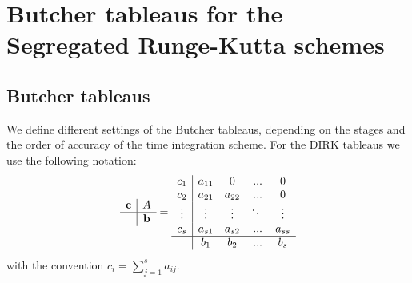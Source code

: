 \chapter{Butcher tableaus for the Segregated Runge-Kutta schemes} %
\label{appendix-butcher_tableaus}
\appendix
\section*{Butcher tableaus} %
\label{appendix:Butcher_tab}
We define different settings of the Butcher tableaus, depending on the stages and the order of accuracy of the time integration scheme. For the DIRK tableaus we use the following notation:
\begin{equation*}
\begin{array}{c|c}
\mathbf{c}&A\\
\hline
&\mathbf{b}
\end{array}=\begin{array}{c|cccc}
c_1&a_{11}&0&...&0\\
c_2&a_{21}&a_{22}&...&0\\
\vdots&\vdots&\vdots&\ddots&\vdots\\
c_s&a_{s1}&a_{s2}&...&a_{ss}\\
\hline
&b_1&b_2&...&b_s
\end{array}
\end{equation*}
with the convention $c_i=\sum_{j=1}^sa_{ij}$.

